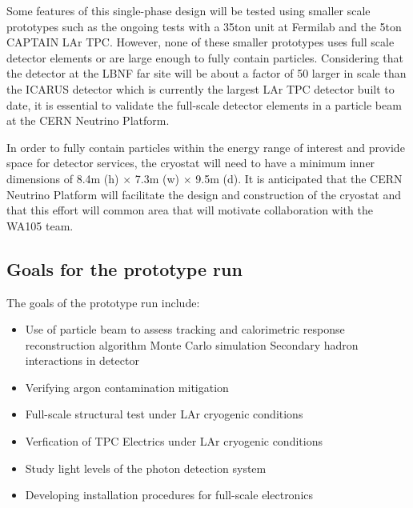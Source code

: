 Some features of this single-phase design will be tested using smaller scale prototypes such as the ongoing tests with a 35ton unit at Fermilab and the 5ton 
CAPTAIN LAr TPC.  However, none of these smaller prototypes uses full scale detector elements or are large enough to fully contain particles.  Considering that 
the detector at the LBNF far site will be about a factor of 50 larger in scale than the ICARUS detector which is currently the largest LAr TPC detector built 
to date, it is essential to validate the full-scale detector elements in a particle beam at the CERN Neutrino Platform.    

In order to fully contain particles within the energy range of interest and provide space for detector services, the cryostat will need to have a minimum inner 
dimensions of 8.4m (h) $\times$ 7.3m (w) $\times$ 9.5m (d).  It is anticipated that the CERN Neutrino Platform will facilitate the design and construction of 
the cryostat and that this effort will common area that will motivate collaboration with the WA105 team.

\subsection{Goals for the prototype run}
The goals of the prototype run include:
\begin{itemize}
\item Use of particle beam to assess
 \subitem tracking and calorimetric response
 \subitem reconstruction algorithm
 \subitem Monte Carlo simulation
 \subitem Secondary hadron interactions in detector
\item Verifying argon contamination mitigation
\item Full-scale structural test under LAr cryogenic conditions
\item Verfication of TPC Electrics under LAr cryogenic conditions
\item Study light levels of the photon detection system
\item Developing installation procedures for full-scale electronics

\end{itemize}

